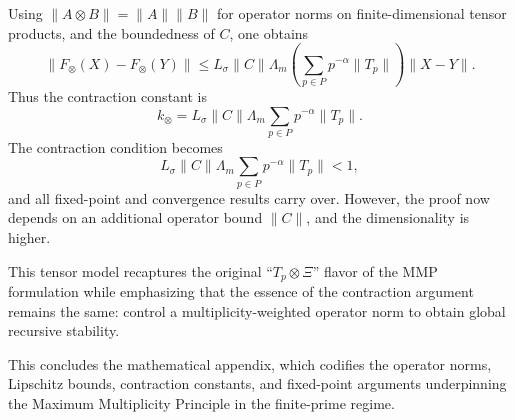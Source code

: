 \documentclass[12pt]{article}
\begin{document}
Using \(\|A\otimes B\| = \|A\| \|B\|\) for operator norms on finite-dimensional tensor products, and the boundedness of \(C\), one obtains
\[
  \|F_{\otimes}(X)-F_{\otimes}(Y)\|
  \le
  L_\sigma \|C\| \Lambda_m \left(\sum_{p\in P} p^{-\alpha}\|T_p\|\right) \|X-Y\|.
\]
Thus the contraction constant is
\[
  k_{\otimes} = L_\sigma \|C\| \Lambda_m \sum_{p\in P} p^{-\alpha}\|T_p\|.
\]
The contraction condition becomes
\[
  L_\sigma \|C\| \Lambda_m \sum_{p\in P} p^{-\alpha}\|T_p\| < 1,
\]
and all fixed-point and convergence results carry over. However, the proof now depends on an additional operator bound \(\|C\|\), and the dimensionality is higher.

This tensor model recaptures the original ``\(T_p \otimes \Xi\)'' flavor of the MMP formulation while emphasizing that the essence of the contraction argument remains the same: control a multiplicity-weighted operator norm to obtain global recursive stability.

\bigskip

This concludes the mathematical appendix, which codifies the operator norms, Lipschitz bounds, contraction constants, and fixed-point arguments underpinning the Maximum Multiplicity Principle in the finite-prime regime.


\nocite{*}


\end{document}

